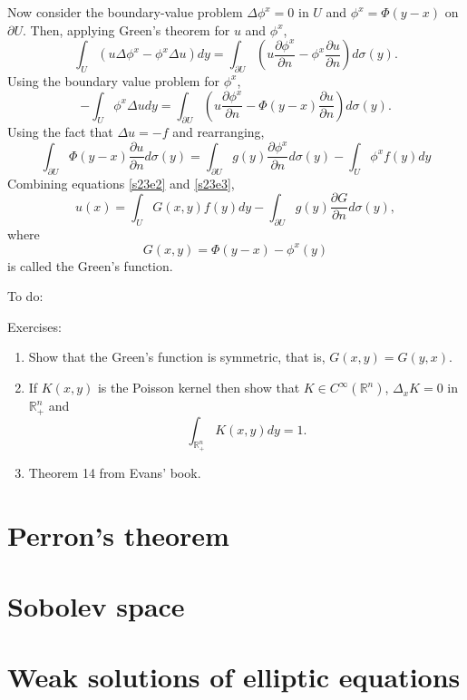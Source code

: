 \documentclass{article}
\newcommand{\pd}[2]{\frac{\partial{#1}}{\partial{#2}}}
\theoremstyle{plain}
\numberwithin{thm}{section}
\theoremstyle{plain}
\numberwithin{prop}{section}
\theoremstyle{definition}
\numberwithin{defn}{section}
\theoremstyle{remark}
\numberwithin{equation}{section}
\begin{document}
Now consider the boundary-value problem $\Delta\phi^x = 0$ in $U$ and $\phi^x = \Phi(y - x)$ on $\partial U$. Then,
applying Green's theorem for $u$ and $\phi^x$,
\[
\int_U(u\Delta\phi^x - \phi^x\Delta u)dy = 
\int_{\partial U}\left(u\pd{\phi^x}{n} - \phi^x\pd{u}{n}\right)d\sigma(y).
\]
Using the boundary value problem for $\phi^x$, 
\[
-\int_U \phi^x\Delta u dy = \int_{\partial U}\left(u\pd{\phi^x}{n} - \Phi(y - x)\pd{u}{n}\right)d\sigma(y).
\]
Using the fact that $\Delta u = -f$ and rearranging,
\begin{equation}\label{s23e3}
\int_{\partial U} \Phi(y - x)\pd{u}{n} d\sigma(y) = 
\int_{\partial U} g(y)\pd{\phi^x}{n} d\sigma(y) - \int_U \phi^x f(y) dy
\end{equation}
Combining equations \eqref{s23e2} and \eqref{s23e3},
\begin{equation}\label{s23e4}
u(x) = \int_U G(x, y)f(y)dy - \int_{\partial U} g(y)\pd{G}{n}d\sigma(y),
\end{equation}
where
\begin{equation}\label{s23e5}
G(x, y) = \Phi(y - x) - \phi^x(y)
\end{equation}
is called the Green's function.

{\color{red}\noindent To do:

Exercises:
\begin{enumerate}
\item Show that the Green's function is symmetric, that is, $G(x, y) = G(y, x)$.
\item If $K(x, y)$ is the Poisson kernel then show that $K \in C^\infty(\mathbb{R}^n)$, $\Delta_x K = 0$ in
$\mathbb{R}^n_+$ and 
\[
\int_{\mathbb{R}^n_+}K(x, y)dy = 1.
\]
\item Theorem 14 from Evans' book.
\end{enumerate}
}

\section{Perron's theorem}\label{s24}

\section{Sobolev space}\label{s25}

\section{Weak solutions of elliptic equations}\label{s26}
\end{document}

